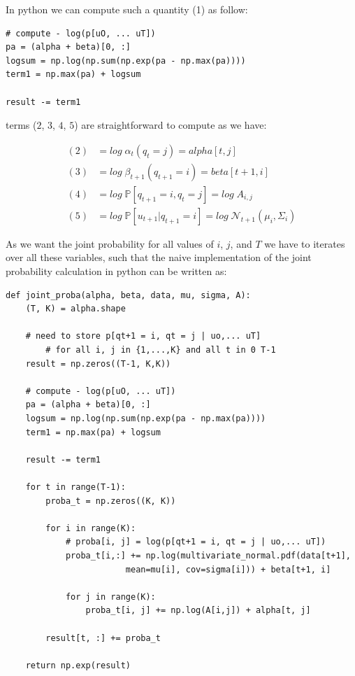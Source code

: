 \documentclass[11pt]{article}
\numberwithin{figure}{section} %
\begin{document}
In python we can compute such a quantity (1) as follow:

\begin{verbatim}
# compute - log(p[uO, ... uT])
pa = (alpha + beta)[0, :]
logsum = np.log(np.sum(np.exp(pa - np.max(pa))))
term1 = np.max(pa) + logsum
			
result -= term1
\end{verbatim}

terms ($2$, $3$, $4$, $5$) are straightforward to compute as we have:

\begin{align*}
(2) &= log\; \alpha_t(q_t = j) = alpha[t, j] \\
(3) &= log\; \beta_{t+1}(q_{t+1}=i) = beta[t+1, i] \\
(4) &= log\; \mathbb{P}[q_{t+1} = i, q_t = j] = log\; A_{i,j} \\
(5) &= log\; \mathbb{P}[u_{t+1} | q_{t+1}=i] = log\; \mathcal{N}_{t+1}(\mu_i, \Sigma_i)
\end{align*}

As we want the joint probability for all values of $i$, $j$, and $T$ we have to iterates over all these variables, such that the naive
implementation of the joint probability calculation in python can be written as:

\begin{verbatim}
def joint_proba(alpha, beta, data, mu, sigma, A):
    (T, K) = alpha.shape
    
    # need to store p[qt+1 = i, qt = j | uo,... uT]
		# for all i, j in {1,...,K} and all t in 0 T-1
    result = np.zeros((T-1, K,K))
    
    # compute - log(p[uO, ... uT])
    pa = (alpha + beta)[0, :]
    logsum = np.log(np.sum(np.exp(pa - np.max(pa))))
    term1 = np.max(pa) + logsum
    
    result -= term1
    
    for t in range(T-1):
        proba_t = np.zeros((K, K))
        
        for i in range(K):
            # proba[i, j] = log(p[qt+1 = i, qt = j | uo,... uT])
            proba_t[i,:] += np.log(multivariate_normal.pdf(data[t+1],
						mean=mu[i], cov=sigma[i])) + beta[t+1, i]
            
            for j in range(K):
                proba_t[i, j] += np.log(A[i,j]) + alpha[t, j]
        
        result[t, :] += proba_t
        
    return np.exp(result)
\end{verbatim}
\end{document}
